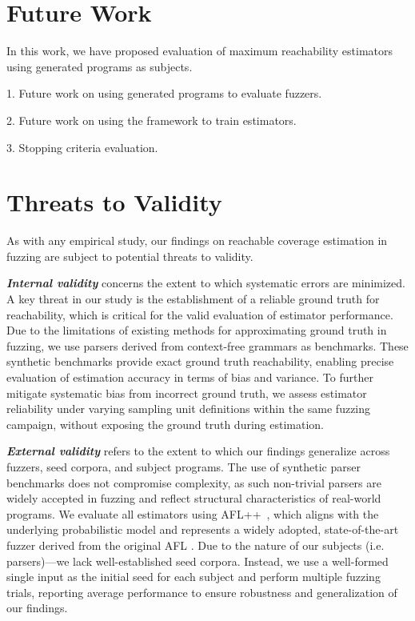 \documentclass[conference,anonymous,review]{IEEEtran}
\begin{document}
\section{Future Work}\label{sec:future}
In this work, we have proposed evaluation of maximum reachability estimators using
generated programs as subjects.

1. Future work on using generated programs to evaluate fuzzers.

2. Future work on using the framework to train estimators.

3. Stopping criteria evaluation.

\section{Threats to Validity}\label{sec:threats}

As with any empirical study, our findings on reachable coverage estimation in fuzzing are subject to potential threats to validity.

\emph{\textbf{Internal validity}} concerns the extent to which systematic errors are minimized. A key threat in our study is the establishment of a reliable ground truth for reachability, which is critical for the valid evaluation of estimator performance. Due to the limitations of existing methods for approximating ground truth in fuzzing, we use parsers derived from context-free grammars as benchmarks. These synthetic benchmarks provide exact ground truth reachability, enabling precise evaluation of estimation accuracy in terms of bias and variance. To further mitigate systematic bias from incorrect ground truth, we assess estimator reliability under varying sampling unit definitions within the same fuzzing campaign, without exposing the ground truth during estimation.

\emph{\textbf{External validity}} refers to the extent to which our findings generalize across fuzzers, seed corpora, and subject programs. The use of synthetic parser benchmarks does not compromise complexity, as such non-trivial parsers are widely accepted in fuzzing \cite{lee2022fuzzle} and reflect structural characteristics of real-world programs. We evaluate all estimators using AFL++~\cite{fioraldi2020AFL++}, which aligns with the underlying probabilistic model and represents a widely adopted, state-of-the-art fuzzer derived from the original AFL \cite{zalewski2017american}. Due to the nature of our subjects (i.e. parsers)—we lack well-established seed corpora. Instead, we use a well-formed single input as the initial seed for each subject and perform multiple fuzzing trials, reporting average performance to ensure robustness and generalization of our findings.
\end{document}

